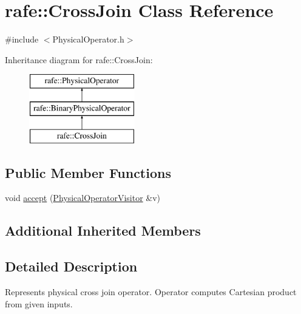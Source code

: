 \hypertarget{classrafe_1_1_cross_join}{\section{rafe\+:\+:Cross\+Join Class Reference}
\label{classrafe_1_1_cross_join}
}


{\ttfamily \#include $<$Physical\+Operator.\+h$>$}

Inheritance diagram for rafe\+:\+:Cross\+Join\+:\begin{figure}[H]
\begin{center}
\leavevmode
\includegraphics[height=3.000000cm]{classrafe_1_1_cross_join}
\end{center}
\end{figure}
\subsection*{Public Member Functions}
\begin{DoxyCompactItemize}
\item 
void \hyperlink{classrafe_1_1_cross_join_a3d9272caf9e1f2394f0d384f2813258a}{accept} (\hyperlink{classrafe_1_1_physical_operator_visitor}{Physical\+Operator\+Visitor} \&v)
\end{DoxyCompactItemize}
\subsection*{Additional Inherited Members}


\subsection{Detailed Description}
Represents physical cross join operator. Operator computes Cartesian product from given inputs. 

